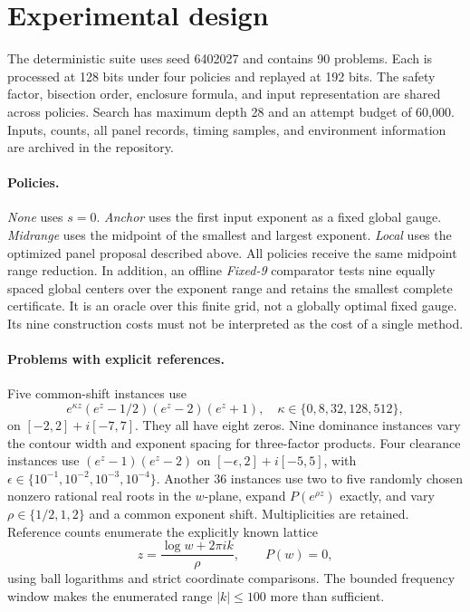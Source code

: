 \documentclass[11pt,a4paper]{article}
\begin{document}
\section{Experimental design}
\label{sec:experiments}
The deterministic suite uses seed 6402027 and contains 90 problems. Each is processed at 128 bits under four policies and replayed at 192 bits. The safety factor, bisection order, enclosure formula, and input representation are shared across policies. Search has maximum depth 28 and an attempt budget of 60,000. Inputs, counts, all panel records, timing samples, and environment information are archived in the repository.

\paragraph{Policies.}
\emph{None} uses $s=0$. \emph{Anchor} uses the first input exponent as a fixed global gauge. \emph{Midrange} uses the midpoint of the smallest and largest exponent. \emph{Local} uses the optimized panel proposal described above. All policies receive the same midpoint range reduction. In addition, an offline \emph{Fixed-9} comparator tests nine equally spaced global centers over the exponent range and retains the smallest complete certificate. It is an oracle over this finite grid, not a globally optimal fixed gauge. Its nine construction costs must not be interpreted as the cost of a single method.

\paragraph{Problems with explicit references.}
Five common-shift instances use
\begin{equation}
 e^{\kappa z}(e^z-1/2)(e^z-2)(e^z+1),
 \quad \kappa\in\{0,8,32,128,512\},
\end{equation}
on $[-2,2]+i[-7,7]$. They all have eight zeros. Nine dominance instances vary the contour width and exponent spacing for three-factor products. Four clearance instances use $(e^z-1)(e^z-2)$ on $[-\epsilon,2]+i[-5,5]$, with $\epsilon\in\{10^{-1},10^{-2},10^{-3},10^{-4}\}$. Another 36 instances use two to five randomly chosen nonzero rational real roots in the $w$-plane, expand $P(e^{\rho z})$ exactly, and vary $\rho\in\{1/2,1,2\}$ and a common exponent shift. Multiplicities are retained. Reference counts enumerate the explicitly known lattice
\begin{equation}\label{eq:lattice}
 z=\frac{\log w+2\pi i k}{\rho},\qquad P(w)=0,
\end{equation}
using ball logarithms and strict coordinate comparisons. The bounded frequency window makes the enumerated range $|k|\le100$ more than sufficient.
\end{document}
